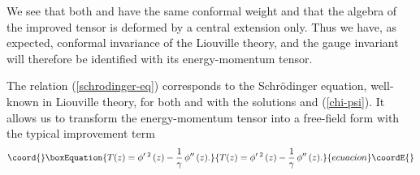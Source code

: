 \documentclass[a4paper,12pt]{article}
\begin{document}
We see that both \coordHE{} and \coordHE{} have the same
conformal weight \coordHE{} and that the algebra of the improved
tensor is deformed by a central extension only.  Thus we have, as
expected, conformal invariance of the Liouville theory, and the gauge
invariant \coordHE{} will therefore be identified with its energy-momentum
tensor.

\noindent
The relation (\ref{schrodinger-eq}) corresponds to the Schr\"odinger
equation, well-known in Liouville theory, for both \coordHE{} and
\coordHE{} with the solutions \coordHE{} and
(\ref{chi-psi}).  It allows us to transform the energy-momentum tensor
into a free-field form with the typical improvement term
\begin{equation}\coord{}\boxEquation{\label{T-phi}
T(z) =\phi'\,^2\,(z)-\frac{1}{\gamma}\,\phi''\,(z).
}{T(z) =\phi'\,^2\,(z)-\frac{1}{\gamma}\,\phi''\,(z).
}{ecuacion}\coordE{}\end{equation}
\end{document}
